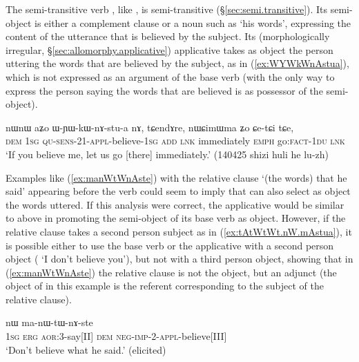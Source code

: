 The semi-transitive verb , like , is semi-transitive (§\ref{sec:semi.transitive}). Its semi-object is either a complement clause or a noun such as  `his words', expressing the content of the utterance that is believed by the subject. Its (morphologically irregular, §\ref{sec:allomorphy.applicative}) applicative  takes as object the person uttering the words that are believed by the subject, as in (\ref{ex:WYWkWnAstua}), which is not expressed as an argument of the base verb (with  the only way to express the person saying the words that are believed is as possessor of the semi-object).

\begin{exe}
\ex \label{ex:WYWkWnAstua}
\gll nɯnɯ aʑo ɯ-ɲɯ-kɯ-nɤ-stu-a nɤ, tɕendɤre, nɯɕimɯma ʑo ɕe-tɕi tɕe, \\
\textsc{dem} \textsc{1sg} \textsc{qu}-\textsc{sens}-2\fl{}1-\textsc{appl}-believe-\textsc{1sg} \textsc{add} \textsc{lnk} immediately \textsc{emph} go:\textsc{fact}-\textsc{1du} \textsc{lnk} \\
\glt `If you believe me, let us go [there] immediately.' (140425 shizi huli he lu-zh)
\end{exe}

Examples like (\ref{ex:manWtWnAste}) with the relative clause  `(the words) that he said' appearing before the verb could seem to imply that  can also select as object the words uttered. If this analysis were correct, the applicative  would be similar to  above in promoting the semi-object of its base verb as object. However, if the relative clause takes a second person subject as in (\ref{ex:tAtWtWt.nW.mAstua}), it is possible either to use the base verb  or the applicative  with a second person object ( `I don't believe you'), but not with a third person object, showing that in (\ref{ex:manWtWnAste}) the relative clause is not the object, but an adjunct (the object of  in this example is the referent corresponding to the subject of the relative clause).

\begin{exe}
\ex \label{ex:manWtWnAste}
 nɯ ma-nɯ-tɯ-nɤ-ste \\
\textsc{1sg} \textsc{erg} \textsc{aor}:3\flobv{}-say[II] \textsc{dem} \textsc{neg}-\textsc{imp}-2-\textsc{appl}-believe[III] \\
\glt `Don't believe what he said.' (elicited)
\end{exe}


